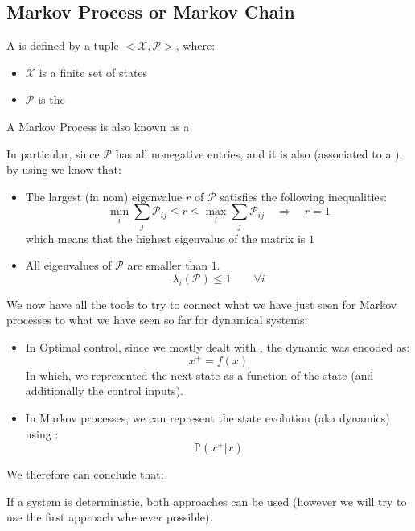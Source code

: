 \subsection{Markov Process or Markov Chain}

A  is defined by a tuple $<\mathcal{X}, \mathcal{P}>$, where:
\begin{itemize}
\item $\mathcal{X}$ is a finite set of states
\item $\mathcal{P}$ is the 
\end{itemize}
A Markov Process is also known as a 

In particular, since $\mathcal{P}$ has all nonegative entries, and it is also  (associated to a ), by using  we know that:
\begin{itemize}
\item The largest (in nom) eigenvalue $r$ of $\mathcal{P}$ satisfies the following inequalities:
\[\min_i \sum_j \mathcal{P}_{ij}\le r\le\max_i \sum_{j}\mathcal{P}_{ij}\quad\Rightarrow\quad r = 1\]
which means that the highest eigenvalue of the matrix is $1$
\item All eigenvalues of $\mathcal{P}$ are smaller than $1$.
\[\lambda_i(\mathcal{P})\le 1 \qquad \forall i\]
\end{itemize}

We now have all the tools to try to connect what we have just seen for Markov processes to what we have seen so far for dynamical systems:
\begin{itemize}
\item In Optimal control, since we mostly dealt with , the dynamic was encoded as:
\[x^+ = f(x)\]
In which, we represented the next state as a function of the state (and  additionally the control inputs).

\item In Markov processes, we can represent the state evolution (aka dynamics) using :
\[\mathbb{P}(x^+|x)\]
\end{itemize}
We therefore can conclude that: 

If a system is deterministic, both approaches can be used (however we will try to use the first approach whenever possible).

